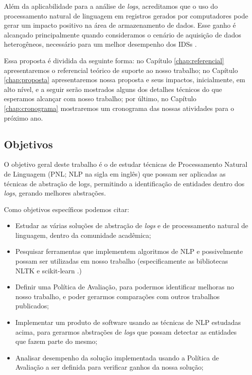 \documentclass[
	12pt,				%
	openright,			%
	twoside,			%
	a4paper,			%
	english,			%
	french,				%
	spanish,			%
	brazil,				%
	]{abntex2}
\begin{document}
Além da aplicabilidade para a análise de \emph{logs}, acreditamos que o uso do processamento natural de linguagem em registros gerados por computadores pode gerar um impacto positivo na área de armazenamento de dados. Esse ganho é alcançado principalmente quando consideramos o cenário de aquisição de dados heterogêneos, necessário para um melhor desempenho dos IDSs \cite{zuech2015intrusion}.

Essa proposta é dividida da seguinte forma: no Capítulo \ref{chap:referencial} apresentaremos o referencial teórico de suporte ao nosso trabalho; no Capítulo \ref{chap:proposta} apresentaremos nossa proposta e seus impactos, inicialmente, em alto nível, e a seguir serão mostrados alguns dos detalhes técnicos do que esperamos alcançar com nosso trabalho; por último, no Capítulo \ref{chap:cronograma} mostraremos um cronograma das nossas atividades para o próximo ano.

\subsection{Objetivos}

O objetivo geral deste trabalho é o de estudar técnicas de Processamento Natural de Linguagem (PNL; NLP na sigla em inglês) que possam ser aplicadas as técnicas de abstração de logs, permitindo a identificação de entidades dentro dos \emph{logs}, gerando melhores abstrações.

Como objetivos específicos podemos citar:
\begin{itemize}
	\item{} Estudar as várias soluções de abstração de \emph{logs} e de processamento natural de linguagem, dentro da comunidade acadêmica;

	\item{} Pesquisar ferramentas que implementem algoritmos de NLP e possivelmente possam ser utilizadas em nosso trabalho (especificamente as bibliotecas NLTK \cite{bird2009natural} e scikit-learn \cite{pedregosa2008scikitlearn}.)
	
	\item{} Definir uma Política de Avaliação, para podermos identificar melhoras no nosso trabalho, e poder gerarmos comparações com outros trabalhos publicados;
	
	\item{} Implementar um produto de software usando as técnicas de NLP estudadas acima, para gerarmos abstrações de \emph{logs} que possam detectar as entidades que fazem parte do mesmo;
	
	\item{} Analisar desempenho da solução implementada usando a Política de Avaliação a ser definida para verificar ganhos da nossa solução;
		
\end{itemize}
\end{document}

